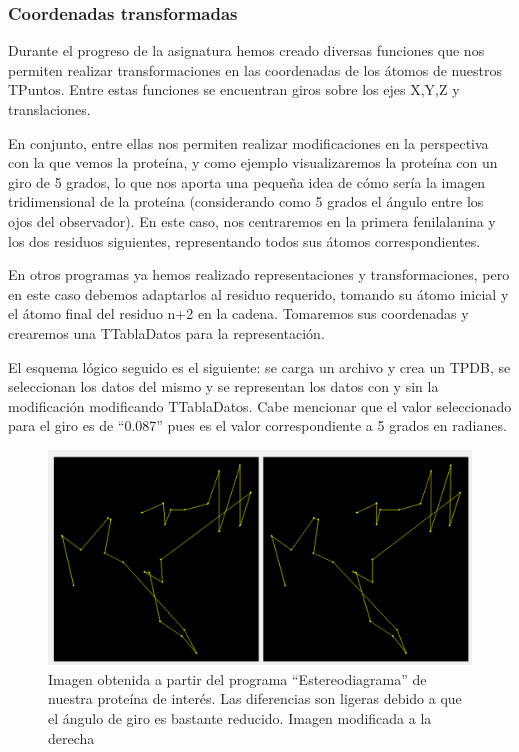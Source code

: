 \documentclass[12pt]{article}
\begin{document}
\subsubsection{Coordenadas transformadas}
Durante el progreso de la asignatura hemos creado diversas funciones que nos permiten realizar transformaciones en las coordenadas de los átomos de nuestros TPuntos. Entre estas funciones se encuentran giros sobre los ejes X,Y,Z y translaciones. 
\newline

En conjunto, entre ellas nos permiten realizar modificaciones en la perspectiva con la que vemos la proteína, y como ejemplo visualizaremos la proteína con un giro de 5 grados, lo que nos aporta una pequeña idea de cómo sería la imagen tridimensional de la proteína (considerando como 5 grados el ángulo entre los ojos del observador). En este caso, nos centraremos en la primera fenilalanina y los dos residuos siguientes, representando todos sus átomos correspondientes.
\newline

En otros programas ya hemos realizado representaciones y transformaciones, pero en este caso debemos adaptarlos al residuo requerido, tomando su átomo inicial y el átomo final del residuo n+2 en la cadena. Tomaremos sus coordenadas y crearemos una TTablaDatos para la representación.
\newline

El esquema lógico seguido es el siguiente: se carga un archivo y crea un TPDB, se seleccionan los datos del mismo y se representan los datos con y sin la modificación modificando TTablaDatos. Cabe mencionar que el valor seleccionado para el giro es de ``0.087'' pues es el valor correspondiente a 5 grados en radianes.
\newline

\begin{figure}[H]
\centering
\includegraphics[scale=0.45]{Screenshot_48}
\caption{Imagen obtenida a partir del programa ``Estereodiagrama'' de nuestra proteína de interés. Las diferencias son ligeras debido a que el ángulo de giro es bastante reducido. Imagen modificada a la derecha}
\end{figure}
\end{document}
